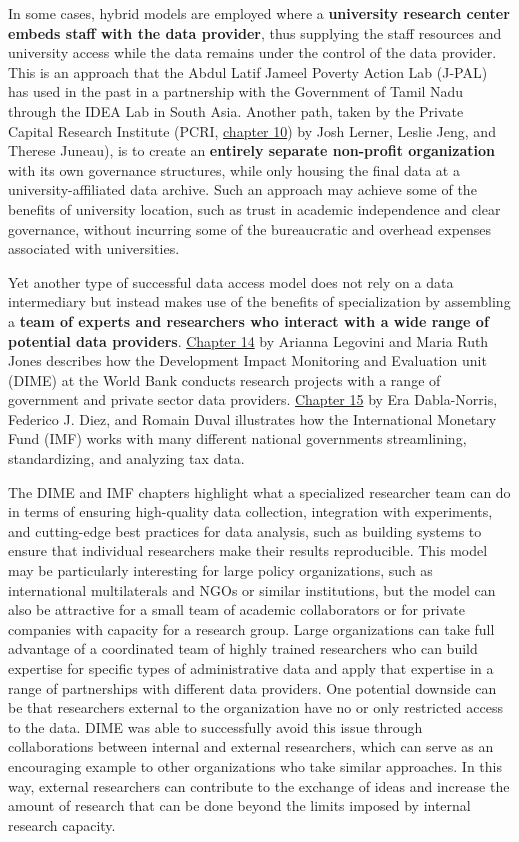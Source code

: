 In some cases, hybrid models are employed where a \textbf{university research center embeds staff with the data provider}, thus supplying the staff resources and university access while the data remains under the control of the data provider. This is an approach that the Abdul Latif Jameel Poverty Action Lab (J-PAL) has used in the past in a partnership with the Government of Tamil Nadu through the IDEA Lab in South Asia. Another path, taken by the Private Capital Research Institute (PCRI, \protect\hyperlink{pcri}{chapter 10}) by Josh Lerner, Leslie Jeng, and Therese Juneau), is to create an \textbf{entirely separate non-profit organization} with its own governance structures, while only housing the final data at a university-affiliated data archive. Such an approach may achieve some of the benefits of university location, such as trust in academic independence and clear governance, without incurring some of the bureaucratic and overhead expenses associated with universities.

Yet another type of successful data access model does not rely on a data intermediary but instead makes use of the benefits of specialization by assembling a \textbf{team of experts and researchers who interact with a wide range of potential data providers}. \protect\hyperlink{dime}{Chapter 14} by Arianna Legovini and Maria Ruth Jones describes how the Development Impact Monitoring and Evaluation unit (DIME) at the World Bank conducts research projects with a range of government and private sector data providers. \protect\hyperlink{imf}{Chapter 15} by Era Dabla-Norris, Federico J. Diez, and Romain Duval illustrates how the International Monetary Fund (IMF) works with many different national governments streamlining, standardizing, and analyzing tax data.

The DIME and IMF chapters highlight what a specialized researcher team can do in terms of ensuring high-quality data collection, integration with experiments, and cutting-edge best practices for data analysis, such as building systems to ensure that individual researchers make their results reproducible. This model may be particularly interesting for large policy organizations, such as international multilaterals and NGOs or similar institutions, but the model can also be attractive for a small team of academic collaborators or for private companies with capacity for a research group. Large organizations can take full advantage of a coordinated team of highly trained researchers who can build expertise for specific types of administrative data and apply that expertise in a range of partnerships with different data providers. One potential downside can be that researchers external to the organization have no or only restricted access to the data. DIME was able to successfully avoid this issue through collaborations between internal and external researchers, which can serve as an encouraging example to other organizations who take similar approaches. In this way, external researchers can contribute to the exchange of ideas and increase the amount of research that can be done beyond the limits imposed by internal research capacity.

